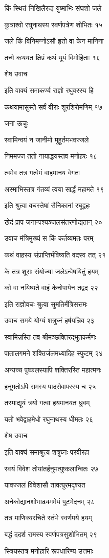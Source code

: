 किं स्थितं निखिलैरद्य युष्माभिः संघशो जले

कुत्राश्वो रघुनाथस्य स्वर्णपत्रेण शोभितः १५

जले किं विनिमग्नोऽसौ हृतो वा केन मानिना

तन्मे कथयत क्षिप्रं कथं यूयं विमोहिताः १६

शेष उवाच

इति वाक्यं समाकर्ण्य राज्ञो रघुवरस्य हि

कथयामासुस्ते सर्वं वीराः शूरशिरोमणिम् १७

जना ऊचुः

स्वामिन्वयं न जानीमो मुहूर्तमभवज्जले

निममज्ज ततो नायाद्धयस्तव मनोहरः १८

त्वमेव तत्र गत्वेमं वाहमानय वेगतः

अस्माभिस्तत्र गंतव्यं त्वया सार्द्धं महामते १९

इति श्रुत्वा वचस्तेषां सैनिकानां रघूद्वहः

खेदं प्राप जनान्पश्यञ्जलसंतरणोद्यतान् २०

उवाच मंत्रिमुख्यं स किं कर्तव्यमतः परम्

कथं वाहस्य संप्राप्तिर्भविष्यति वदस्व तत् २१

के तत्र शूराः संयोज्या जलेऽन्वेषयितुं हयम्

को वा नयिष्यते वाहं केनोपायेन तद्वद २२

इति राज्ञोवचः श्रुत्वा सुमतिर्मंत्रिसत्तमः

उवाच समये योग्यं शत्रुघ्नं हर्षयन्निव २३

स्वामिन्नस्ति तव श्रीमञ्छक्तिरद्भुतकर्मणः

पातालगमने शक्तिर्जलमध्यादिह स्फुटम् २४

अन्यच्च पुष्कलस्यापि शक्तिरस्ति महात्मनः

हनूमतोऽपि रामस्य पादसेवापरस्य च २५

तस्माद्यूयं त्रयो गत्वा हयमानयत ध्रुवम्

यतो भवेद्वाहमेधो रघुनाथस्य धीमतः २६

शेष उवाच

इति वाक्यं समाश्रुत्य शत्रुघ्नः परवीरहा

स्वयं विवेश तोयांतर्हनुमत्पुष्कलान्वितः २७

यावज्जलं विवेशासौ तावत्पुरमदृश्यत

अनेकोद्यानशोभाढ्यममेयं पुटभेदनम् २८

तत्र माणिक्यरचिते स्तंभे स्वर्णमये हयम्

बद्धं ददर्श रामस्य स्वर्णपत्रसुशोभितम् २९

स्त्रियस्तत्र मनोहारि रूपधारिण्य उत्तमाः

